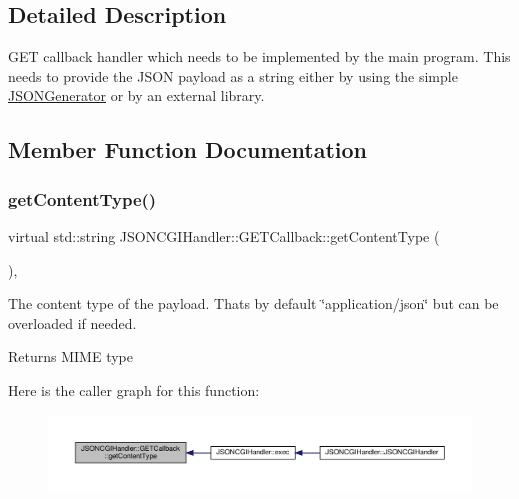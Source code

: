 \subsection{Detailed Description}
G\+ET callback handler which needs to be implemented by the main program. This needs to provide the J\+S\+ON payload as a string either by using the simple \hyperlink{classJSONCGIHandler_1_1JSONGenerator}{J\+S\+O\+N\+Generator} or by an external library. 

\subsection{Member Function Documentation}
\mbox{\label{classJSONCGIHandler_1_1GETCallback_a4e1fee495ddeb4e24eaa5b8e767ea838}} 
\subsubsection{\texorpdfstring{get\+Content\+Type()}{getContentType()}}
{\footnotesize\ttfamily virtual std\+::string J\+S\+O\+N\+C\+G\+I\+Handler\+::\+G\+E\+T\+Callback\+::get\+Content\+Type (\begin{DoxyParamCaption}{ }\end{DoxyParamCaption})\hspace{0.3cm}{\ttfamily [inline]}, {\ttfamily [virtual]}}

The content type of the payload. That\textquotesingle{}s by default \char`\"{}application/json\char`\"{} but can be overloaded if needed. \begin{DoxyReturn}{Returns}
M\+I\+ME type 
\end{DoxyReturn}
Here is the caller graph for this function\+:
\nopagebreak
\begin{figure}[H]
\begin{center}
\leavevmode
\includegraphics[width=350pt]{classJSONCGIHandler_1_1GETCallback_a4e1fee495ddeb4e24eaa5b8e767ea838_icgraph}
\end{center}
\end{figure}
\mbox{\label{classJSONCGIHandler_1_1GETCallback_a2367bf5a5912e9e5599ee464e0846255}} 
